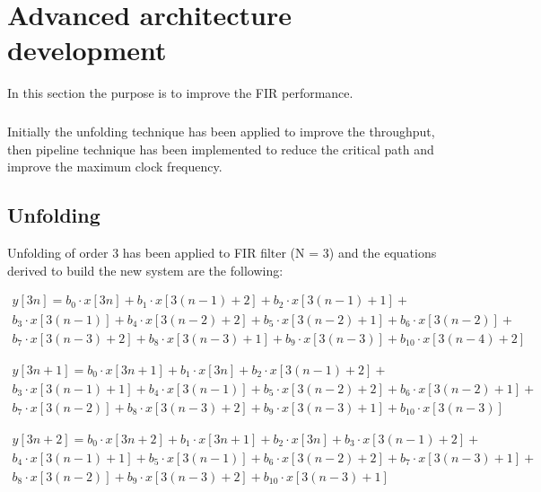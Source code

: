 %
\chapter{Advanced architecture development}
\label{cha3}

In this section the purpose is to improve the FIR performance. 
\paragraph{}
Initially the unfolding 
technique has been applied to improve the throughput, then pipeline technique has 
been implemented to reduce the critical path and improve the maximum clock frequency.

\section{Unfolding}

Unfolding of order 3 has been applied to FIR filter (N = 3) and the equations derived
to build the new system are the following:

\begin{equation}
\begin{split}
    y[3n] = b_0 \cdot x[3n] + b_1 \cdot x[3(n-1) + 2] + b_2 \cdot x[3(n-1) + 1] + \\
    b_3 \cdot x[3(n-1)] + b_4 \cdot x[3(n-2) + 2] + b_5 \cdot x[3(n-2) + 1] + b_6 \cdot x[3(n-2)] +  \\
    b_7 \cdot x[3(n-3) + 2] + b_8 \cdot x[3(n-3) + 1] + b_9 \cdot x[3(n-3)] + b_{10} \cdot x[3(n-4) + 2]
\end{split}
\end{equation}

\begin{equation}
\begin{split}
    y[3n + 1] = b_0 \cdot x[3n + 1] + b_1 \cdot x[3n] + b_2 \cdot x[3(n-1) + 2] + \\
    b_3 \cdot x[3(n-1) + 1] + b_4 \cdot x[3(n-1)] + b_5 \cdot x[3(n-2) + 2] + b_6 \cdot x[3(n-2)+1] +  \\
    b_7 \cdot x[3(n-2)] + b_8 \cdot x[3(n-3)+2] + b_9 \cdot x[3(n-3) + 1] + b_{10} \cdot x[3(n-3)]
\end{split}
\end{equation}

\begin{equation}
\begin{split}
    y[3n + 2] = b_0 \cdot x[3n + 2] + b_1 \cdot x[3n + 1] + b_2 \cdot x[3n] + b_3 \cdot x[3(n-1) + 2] +\\
    b_4 \cdot x[3(n-1) + 1] + b_5 \cdot x[3(n-1)] + b_6 \cdot x[3(n-2) + 2] +  b_7 \cdot x[3(n-3) + 1] +\\
    b_8 \cdot x[3(n-2)] + b_9 \cdot x[3(n-3) + 2] + b_{10} \cdot x[3(n-3) + 1]
\end{split}
\end{equation}

